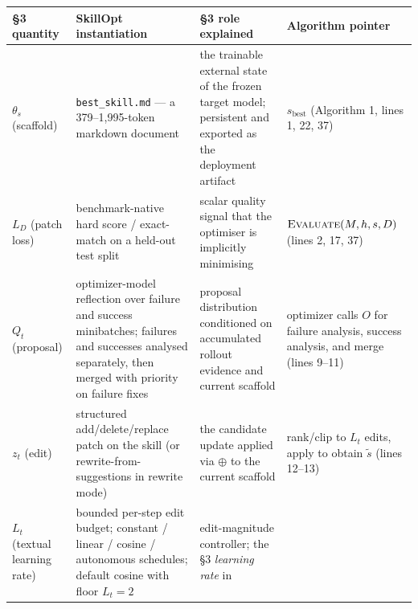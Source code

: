 {\def\LTcaptype{none} %
\begin{longtable}[]{@{}
  >{\raggedright\arraybackslash}p{}
  >{\raggedright\arraybackslash}p{}
  >{\raggedright\arraybackslash}p{}
  >{\raggedright\arraybackslash}p{}@{}}
\toprule\noalign{}
\begin{minipage}[b]{\linewidth}\raggedright
§3 quantity
\end{minipage} & \begin{minipage}[b]{\linewidth}\raggedright
SkillOpt instantiation
\end{minipage} & \begin{minipage}[b]{\linewidth}\raggedright
§3 role explained
\end{minipage} & \begin{minipage}[b]{\linewidth}\raggedright
Algorithm pointer
\end{minipage} \\
\midrule\noalign{}
\endhead
\bottomrule\noalign{}
\endlastfoot
\(\theta_s\) (scaffold) & \texttt{best\_skill.md} --- a 379--1,995-token
markdown document & the trainable external state of the frozen target
model; persistent and exported as the deployment artifact &
\(s_{\text{best}}\) (Algorithm 1, lines 1, 22, 37) \\
\(L_D\) (patch loss) & benchmark-native hard score / exact-match on a
held-out test split & scalar quality signal that the optimiser is
implicitly minimising & \(\textsc{Evaluate}(M, h, s, D)\) (lines 2, 17,
37) \\
\(Q_t\) (proposal) & optimizer-model reflection over failure and success
minibatches; failures and successes analysed separately, then merged
with priority on failure fixes & proposal distribution conditioned on
accumulated rollout evidence and current scaffold & optimizer calls
\(O\) for failure analysis, success analysis, and merge (lines 9--11) \\
\(z_t\) (edit) & structured add/delete/replace patch on the skill (or
rewrite-from-suggestions in rewrite mode) & the candidate update applied
via \(\oplus\) to the current scaffold & rank/clip to \(L_t\) edits,
apply to obtain \(\tilde s\) (lines 12--13) \\
\(L_t\) (textual learning rate) & bounded per-step edit budget; constant
/ linear / cosine / autonomous schedules; default cosine with floor
\(L_t=2\) & edit-magnitude controller; the §3 \emph{learning rate} in

\end{longtable}}
